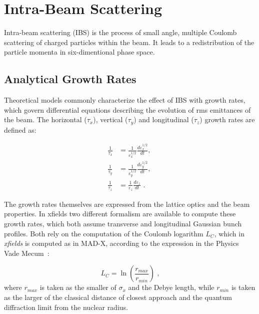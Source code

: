 \section{Intra-Beam Scattering}

Intra-beam scattering (IBS) is the process of small angle, multiple Coulomb scattering of charged particles within the beam.
It leads to a redistribution of the particle momenta in six-dimentional phase space.

\subsection{Analytical Growth Rates}
\label{subsection:ibs_growth_rates}

Theoretical models commonly characterize the effect of IBS with growth rates, which govern differential equations describing the evolution of rms emittances of the beam.
The horizontal (\(\tau_x\)), vertical (\(\tau_y\)) and longitudinal (\(\tau_z\)) growth rates are defined as:

\begin{equation}
    \begin{aligned}
        \frac{1}{\tau_x} &= \frac{1}{\varepsilon_x^{1/2}} \frac{d \varepsilon_x^{1/2}}{dt} \text{,  } \\
        \frac{1}{\tau_y} &= \frac{1}{\varepsilon_y^{1/2}} \frac{d \varepsilon_y^{1/2}}{dt} \text{,  } \\
        \frac{1}{\tau_z} &= \frac{1}{\varepsilon_z} \frac{d \varepsilon_z}{dt} \text{ .}
    \end{aligned}
    \label{equation:ibs_rms_emittances_evolutions}
\end{equation}

The growth rates themselves are expressed from the lattice optics and the beam properties.
In xfields two different formalism are available to compute these growth rates, which both assume transverse and longitudinal Gaussian bunch profiles.
Both rely on the computation of the Coulomb logarithm \(L_C\), which in \textit{xfields} is computed as in MAD-X, according to the expression in the Physics Vade Mecum~\cite{AIP:Anderson:Physics_Vade_Mecum}:

\begin{equation}
    L_C = \ln \left( \frac{r_{max}}{r_{min}} \right) \text{ ,}
    \label{equation:coulomb_logarithm}
\end{equation}
where \(r_{max}\) is taken as the smaller of \(\sigma_x\) and the Debye length, while \(r_{min}\) is taken as the larger of the classical distance of closest approach and the quantum diffraction limit from the nuclear radius.

